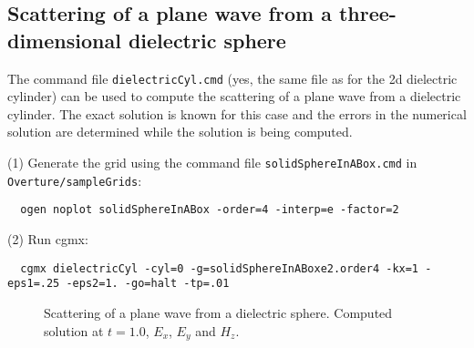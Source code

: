 \documentclass{article}
\begin{document}
\clearpage
\subsection{Scattering of a plane wave from a three-dimensional dielectric sphere} \label{sec:sphere3dDielectricScat}

The command file {\tt dielectricCyl.cmd} (yes, the same file as for the 2d dielectric cylinder) can be used to compute the scattering
of a plane wave from a dielectric cylinder. The exact solution is known for this case
and the errors in the numerical solution are determined while the solution
is being computed.


\noindent (1) Generate the grid using the command file {\tt solidSphereInABox.cmd} in {\tt Overture/sampleGrids}:
{\small
\begin{verbatim}
  ogen noplot solidSphereInABox -order=4 -interp=e -factor=2
\end{verbatim}
}
\noindent (2) Run cgmx: 
{\small
\begin{verbatim}
  cgmx dielectricCyl -cyl=0 -g=solidSphereInABoxe2.order4 -kx=1 -eps1=.25 -eps2=1. -go=halt -tp=.01
\end{verbatim}
}
{
\begin{figure}[hbt]
\newcommand{\figWidth}{5.5cm}
\newcommand{\trimfig}[2]{\trimFig{#1}{#2}{0.1}{0.05}{.05}{.05}}
\begin{center}
\end{center}
\caption{Scattering of a plane wave from a dielectric sphere. Computed solution at $t=1.0$, $E_x$, $E_y$ and $H_z$.}
\label{fig:cyl2dDielectricScat}
\end{figure}
}
\end{document}
